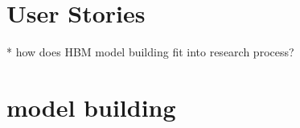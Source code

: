 \section{User Stories}
* how does HBM model building fit into research process?

\section{model building}


